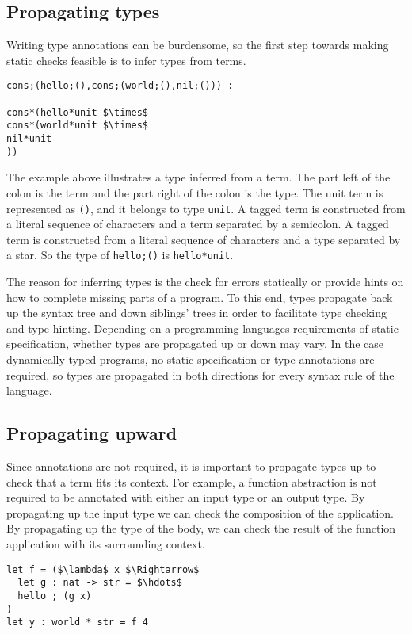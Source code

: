 \documentclass[manuscript]{acmart}
\begin{document}
\subsection{Propagating types}
Writing type annotations can be burdensome, so the first step 
towards making static checks feasible is to infer types from terms.

\begin{lstlisting}
cons;(hello;(),cons;(world;(),nil;())) : 

cons*(hello*unit $\times$ 
cons*(world*unit $\times$ 
nil*unit
))
\end{lstlisting}

\noindent The example above illustrates a type inferred from a term.
The part left of the colon is the term and the part right of the colon is the type.
The unit term is represented as \lstinline{()}, and it belongs to type \lstinline{unit}. 
A tagged term is constructed from a literal sequence of characters and a term separated
by a semicolon. A tagged term is constructed from a literal sequence of characters
and a type separated by a star.
So the type of \lstinline{hello;()} is \lstinline{hello*unit}.

The reason for inferring types is the check for errors statically or 
provide hints on how to complete missing parts of a program. To this end,
types propagate back up the syntax tree and down siblings' trees in order
to facilitate type checking and type hinting.
Depending on a programming languages requirements of static specification, 
whether types are propagated up or down may vary. 
In the case dynamically typed programs, no static specification or type annotations
are required, so types are propagated in both directions for every syntax rule
of the language.


\subsection{Propagating upward}
Since annotations are not required, it is important to propagate types up to check
that a term fits its context.
For example, a function abstraction is not required to be annotated 
with either an input type or an output type. 
\noindent By propagating up the input type we can check the composition of the application.
By propagating up the type of the body, we can check the result of the function application 
with its surrounding context. 

\begin{lstlisting}
let f = ($\lambda$ x $\Rightarrow$ 
  let g : nat -> str = $\hdots$
  hello ; (g x)
) 
let y : world * str = f 4
\end{lstlisting}
\end{document}
